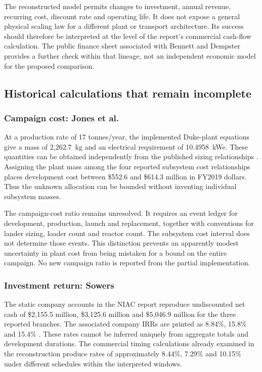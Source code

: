 \documentclass[final,5p,times,twocolumn]{elsarticle}
\begin{document}
The reconstructed model permits changes to investment, annual revenue, recurring cost, discount rate and operating life. It does not expose a general physical scaling law for a different plant or transport architecture. Its success should therefore be interpreted at the level of the report's commercial cash-flow calculation. The public finance sheet associated with Bennett and Dempster \cite{bennett2020} provides a further check within that lineage, not an independent economic model for the proposed comparison.

\subsection{Historical calculations that remain incomplete}
\subsubsection{Campaign cost: Jones et al.}
At a production rate of 17 tonnes/year, the implemented Duke-plant equations give a mass of 2,262.7~kg and an electrical requirement of 10.4958~kWe. These quantities can be obtained independently from the published sizing relationships \cite{jones2020}. Assigning the plant mass among the four reported subsystem cost relationships places development cost between \$552.6 and \$614.3 million in FY2019 dollars. Thus the unknown allocation can be bounded without inventing individual subsystem masses.

The campaign-cost ratio remains unresolved. It requires an event ledger for development, production, launch and replacement, together with conventions for lander sizing, loader count and reactor count. The subsystem cost interval does not determine those events. This distinction prevents an apparently modest uncertainty in plant cost from being mistaken for a bound on the entire campaign. No new campaign ratio is reported from the partial implementation.

\subsubsection{Investment return: Sowers}
The static company accounts in the NIAC report reproduce undiscounted net cash of \$2,155.5 million, \$3,125.6 million and \$5,046.9 million for the three reported branches. The associated company IRRs are printed as 8.84\%, 15.8\% and 15.4\% \cite{sowers2020,sowers2021}. These rates cannot be inferred uniquely from aggregate totals and development durations. The commercial timing calculations already examined in the reconstruction produce rates of approximately 8.44\%, 7.29\% and 10.15\% under different schedules within the interpreted windows.
\end{document}
